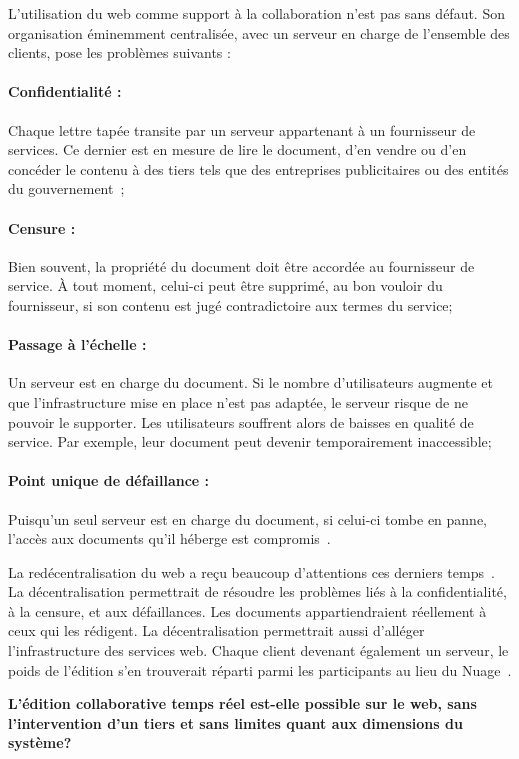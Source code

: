 L'utilisation du web comme support à la collaboration n'est pas sans défaut. Son
organisation éminemment centralisée, avec un serveur en charge de l'ensemble des
clients, pose les problèmes suivants :

\paragraph{Confidentialité :} Chaque lettre tapée transite par un serveur
appartenant à un fournisseur de services. Ce dernier est en mesure de lire le
document, d'en vendre ou d'en concéder le contenu à des tiers tels que des
entreprises publicitaires ou des entités du
gouvernement~\cite{cherrueau2016composer, gellman2013us, pearson2011toward};

\paragraph{Censure :} Bien souvent, la propriété du document doit être accordée
au fournisseur de service. À tout moment, celui-ci peut être supprimé, au bon
vouloir du fournisseur, si son contenu est jugé contradictoire aux termes du
service;

\paragraph{Passage à l'échelle :} Un serveur est en charge du document. Si le
nombre d'utilisateurs augmente et que l'infrastructure mise en place n'est pas
adaptée, le serveur risque de ne pouvoir le supporter. Les utilisateurs
souffrent alors de baisses en qualité de service. Par exemple, leur document
peut devenir temporairement inaccessible;

\paragraph{Point unique de défaillance :} Puisqu'un seul serveur est en charge
du document, si celui-ci tombe en panne, l'accès aux documents qu'il héberge est
compromis~\cite{demers1987epidemic}.
  
La redécentralisation du web a reçu beaucoup d'attentions ces derniers
temps~\cite{mansour2016demonstration, wood2014ethereum}. La décentralisation
permettrait de résoudre les problèmes liés à la confidentialité, à la censure,
et aux défaillances. Les documents appartiendraient réellement à ceux qui les
rédigent. La décentralisation permettrait aussi d'alléger l'infrastructure des
services web. Chaque client devenant également un serveur, le poids de l'édition
s'en trouverait réparti parmi les participants au lieu du
Nuage~\cite{mell2011national}.


\textbf{L'édition collaborative temps réel est-elle possible sur le web, sans
  l'intervention d'un tiers et sans limites quant aux dimensions du système?}

